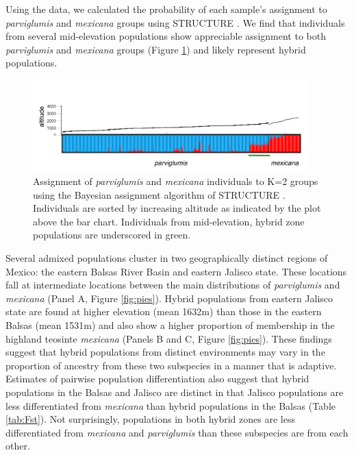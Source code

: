 Using the \citet{Fang2012} data, we calculated the probability of each sample's assignment to \emph{parviglumis} and \emph{mexicana} groups using STRUCTURE \citep{Pritchard2000}.  We find that individuals from several mid-elevation populations show appreciable assignment to both \emph{parviglumis} and \emph{mexicana} groups (Figure \ref{fig:structure}) and likely represent hybrid populations.  

\begin{figure}[h!] 
  \centering
   \includegraphics[width=0.95\textwidth]{structure.pdf}
    \caption{Assignment of \emph{parviglumis} and \emph{mexicana} individuals to K=2 groups using the Bayesian assignment algorithm of STRUCTURE \citep{Pritchard2000}.  Individuals are sorted by increasing altitude as indicated by the plot above the bar chart. Individuals from mid-elevation, hybrid zone populations are underscored in green.} 
\label{fig:structure}
\end{figure}

Several admixed populations cluster in two geographically distinct regions of Mexico: the eastern Balsas River Basin and eastern Jalisco state.  These locations fall at intermediate locations between the main distributions of \emph{parviglumis} and \emph{mexicana} (Panel A, Figure \ref{fig:pies}).  Hybrid populations from eastern Jalisco state are found at higher elevation (mean 1632m) than those in the eastern Balsas (mean 1531m) and also show a higher proportion of membership in the highland teosinte \emph{mexicana} (Panels B and C, Figure \ref{fig:pies}).  These findings suggest that hybrid populations from distinct environments may vary in the proportion of ancestry from these two subspecies in a manner that is adaptive. Estimates of pairwise population differentiation also suggest that hybrid populations in the Balsas and Jalisco are distinct in that Jalisco populations are less differentiated from \emph{mexicana} than hybrid populations in the Balsas (Table \ref{tab:Fst}).  Not surprisingly, populations in both hybrid zones are less differentiated from \emph{mexicana} and \emph{parviglumis} than these subspecies are from each other. 

